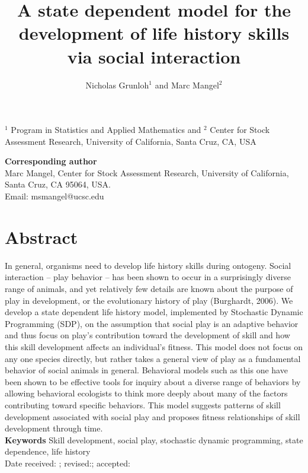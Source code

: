 \documentclass[12pt, letterpaper, fleqn]{article}
\title{A state dependent model for the development of life history skills via social interaction}
\author{Nicholas Grunloh$^1$ and Marc Mangel$^2$}
\begin{document}
\setlength{\mathindent}{3mm}


\maketitle
\noindent $^1$ Program in Statistics and Applied Mathematics and $^2$ Center for Stock Assessment Research, University of California, Santa Cruz, CA, USA

\vspace{2.7 in}
\noindent \textbf{Corresponding author}\\
Marc Mangel, Center for Stock Assessment Research, University of California, Santa Cruz, CA 95064, USA.\\
Email: msmangel@ucsc.edu

\newpage
\section*{Abstract}
In general, organisms need to develop life history skills during ontogeny.  Social interaction -- play behavior -- has been shown to occur  in a surprisingly diverse range of animals, and yet relatively few details are known about the purpose of play in development, or the evolutionary history of play (Burghardt, 2006). %
  We develop a  state dependent life history model, implemented by Stochastic Dynamic Programming (SDP), on  the assumption that social play is an adaptive behavior and thus focus on play's contribution toward the development of skill and how this skill development affects an individual's fitness. %
  This model does not focus on any one species directly, but rather takes a general view of play as a fundamental behavior of social animals in general.
  Behavioral models such as this one  have been shown to be effective tools for inquiry about a diverse range of behaviors by allowing behavioral ecologists to think more deeply about many of the factors contributing toward specific behaviors. %
  This model suggests patterns of skill development associated with social play and proposes fitness relationships of skill development through time. \\
  \newline
  \textbf{Keywords}
  Skill development, social play, stochastic dynamic programming, state dependence, life history\\
  \newline
  Date received:  ; revised:;  accepted: 
  
\end{document}
